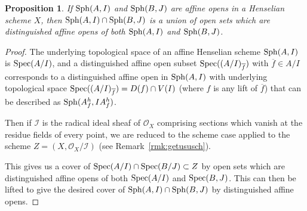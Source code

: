 \documentclass[12pt]{article}
\renewcommand{\O}{\mathscr{O}}
\newcommand{\spec}{{\rm Spec}}
\newcommand{\sph}{{\rm Sph}}
\newcommand{\ol}[1]{\overline{#1}}
\newcommand{\mc}[1]{\mathcal{#1}}
\newtheorem{proposition}[theorem]{Proposition}
\theoremstyle{definition}
\numberwithin{equation}{subsection}
\begin{document}
\begin{proposition}\label{prop:acl} If $\sph(A,I)$ and $\sph(B,J)$ are affine opens in a Henselian scheme $X$, then $\sph(A,I) \cap \sph(B,J)$ is a union of open sets which are distinguished affine opens of both $\sph(A,I)$ and $\sph(B,J)$.
\end{proposition}
\begin{proof} The underlying topological space of an affine Henselian scheme $\sph(A,I)$ is $\spec(A/I)$, and a distinguished affine open subset $\spec((A/I)_{\ol{f}})$ with $\ol{f} \in A/I$ corresponds to a distinguished affine open in $\sph(A,I)$ with underlying topological space $\spec((A/I)_{\ol{f}})=D(f) \cap V(I)$ (where $f$ is any lift of $\ol{f}$) that can be described as $\sph(A_f^h,IA_f^h)$. 

Then if $\mc{I}$ is the radical ideal sheaf of $\O_X$ comprising sections which vanish at the residue fields of every point, we are reduced to the scheme case applied to the scheme $Z=(X,\O_X/\mc{I})$ (see Remark~\ref{rmk:getususch}). 

This gives us a cover of $\spec(A/I) \cap \spec(B/J) \subset Z$ by open sets which are distinguished affine opens of both $\spec(A/I)$ and $\spec(B,J)$. This can then be lifted to give the desired cover of $\sph(A,I) \cap \sph(B,J)$ by distinguished affine opens.\end{proof}
\end{document}
